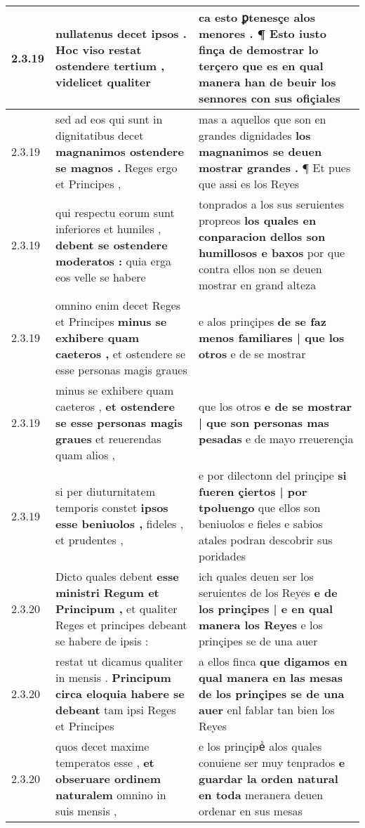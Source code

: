 \begin{tabular}{|p{1cm}|p{6.5cm}|p{6.5cm}|}
2.3.19 & nullatenus decet ipsos . Hoc viso restat \textbf{ ostendere tertium , } videlicet qualiter & ca esto ꝑtenesçe alos menores . \textbf{ ¶ Esto iusto finça de demostrar lo terçero } que es en qual manera han de beuir los sennores con sus ofiçiales \\\hline
2.3.19 & sed ad eos qui sunt in dignitatibus decet \textbf{ magnanimos ostendere se magnos . } Reges ergo et Principes , & mas a aquellos que son en grandes dignidades \textbf{ los magnanimos se deuen mostrar grandes . } ¶ Et pues que assi es los Reyes \\\hline
2.3.19 & qui respectu eorum sunt inferiores et humiles , \textbf{ debent se ostendere moderatos : } quia erga eos velle se habere & tonprados a los sus seruientes propreos \textbf{ los quales en conparacion dellos son humillosos e baxos } por que contra ellos non se deuen mostrar en grand alteza \\\hline
2.3.19 & omnino enim decet Reges et Principes \textbf{ minus se exhibere quam caeteros , } et ostendere se esse personas magis graues & e alos prinçipes \textbf{ de se faz menos familiares | que los otros } e de se mostrar \\\hline
2.3.19 & minus se exhibere quam caeteros , \textbf{ et ostendere se esse personas magis graues } et reuerendas quam alios , & que los otros \textbf{ e de se mostrar | que son personas mas pesadas } e de mayo rreuerençia \\\hline
2.3.19 & si per diuturnitatem temporis constet \textbf{ ipsos esse beniuolos , } fideles , et prudentes , & e por dilectonn del prinçipe \textbf{ si fueren çiertos | por tpoluengo } que ellos son beniuolos e fieles e sabios atales podran descobrir sus poridades \\\hline
2.3.20 & Dicto quales debent \textbf{ esse ministri Regum et Principum , } et qualiter Reges et principes debeant se habere de ipsis : & ich quales deuen ser los seruientes de los Reyes \textbf{ e de los prinçipes | e en qual manera los Reyes } e los prinçipes se de una auer \\\hline
2.3.20 & restat ut dicamus qualiter in mensis . \textbf{ Principum circa eloquia habere se debeant } tam ipsi Reges et Principes & a ellos finca \textbf{ que digamos en qual manera en las mesas de los prinçipes se de una auer } enl fablar tan bien los Reyes \\\hline
2.3.20 & quos decet maxime temperatos esse , \textbf{ et obseruare ordinem naturalem } omnino in suis mensis , & e los prinçipeᷤ alos quales conuiene ser muy tenprados \textbf{ e guardar la orden natural en toda } meranera deuen ordenar en sus mesas \\\hline

\end{tabular}

